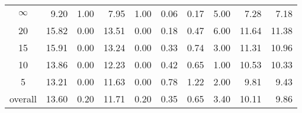 \begin{table}[H]
\begin{tabular}{c rr rr rrr rr}
\midrule
$\infty$ & 9.20 & 1.00 & 7.95 & 1.00 & 0.06 & 0.17 & 5.00 & 7.28 & 7.18 \\
20 & 15.82 & 0.00 & 13.51 & 0.00 & 0.18 & 0.47 & 6.00 & 11.64 & 11.38 \\
15 & 15.91 & 0.00 & 13.24 & 0.00 & 0.33 & 0.74 & 3.00 & 11.31 & 10.96 \\
10 & 13.86 & 0.00 & 12.23 & 0.00 & 0.42 & 0.65 & 1.00 & 10.53 & 10.33 \\
5 & 13.21 & 0.00 & 11.63 & 0.00 & 0.78 & 1.22 & 2.00 & 9.81 & 9.43 \\
\midrule
overall & 13.60 & 0.20 & 11.71 & 0.20 & 0.35 & 0.65 & 3.40 & 10.11 & 9.86 \\
\bottomrule
\end{tabular}
\end{table}